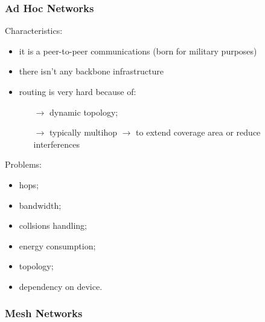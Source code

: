 \subsubsection{Ad Hoc Networks}

Characteristics:
\begin{itemize}
    \item it is a peer-to-peer communications (born for military purposes)
    \item there isn't any backbone infrastructure
    \item routing is very hard because of:
    \begin{itemize}
        \item[$\rightarrow$] dynamic topology;
        \item[$\rightarrow$] typically multihop $\rightarrow$ to
        extend coverage area or reduce interferences
    \end{itemize}
\end{itemize}

Problems:
\begin{multicols}{2}
\begin{itemize}
    \item hops;
    \item bandwidth;
    \item collsions handling;
\end{itemize}
\begin{itemize}
    \item energy consumption;
    \item topology;
    \item dependency on device.
\end{itemize}
\end{multicols}

\subsubsection{Mesh Networks}

